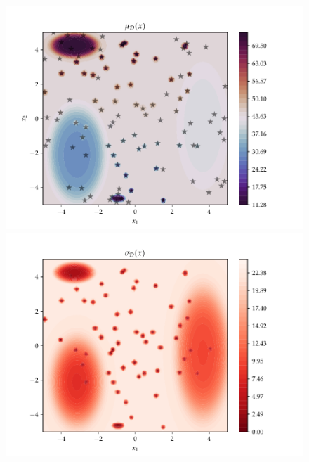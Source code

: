 \begin{figure}[h]
   \begin{minipage}[b]{0.49\textwidth}
    \includegraphics[trim=1.2cm 0.7cm 2cm 1cm,clip,width=\textwidth]{Figures/coco_reg/f23_SPN regression optimized2.pdf}
   \end{minipage}
   \hfill
   \begin{minipage}[b]{0.49\textwidth}
     \includegraphics[trim=1.2cm 0.7cm 2cm 1cm,clip,width=\textwidth]{Figures/coco_reg/f23_SPN regression optimized3.pdf}
    \end{minipage}


\end{figure}
